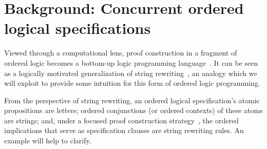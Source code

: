 


% 

% 

\section{Background: Concurrent ordered logical specifications}\label{sec:ordered-lp}

Viewed through a computational lens, proof construction in a fragment of ordered logic becomes a bottom-up logic programming language~\autocite{Pfenning+Simmons:LICS09}.
It can be seen as a logically motivated generalization of string rewriting~\autocite[see, \eg,][]{Book+Otto:SRS93}, an analogy which we will exploit to provide some intuition for this form of ordered logic programming.

From the perspective of string rewriting, an ordered logical specification's atomic propositions are letters; ordered conjunctions (or ordered contexts) of these atoms are strings; and, under a focused proof construction strategy~\autocite{Andreoli:JLC92}, the ordered implications that serve as specification clauses are string rewriting rules.
An example will help to clarify.






% 
